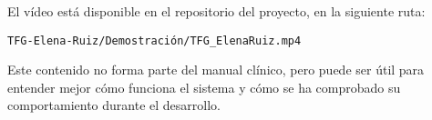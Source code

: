 El vídeo está disponible en el repositorio del proyecto, en la siguiente ruta:

\begin{center}
\texttt{TFG-Elena-Ruiz/Demostraci\'on/TFG\_ElenaRuiz.mp4}
\end{center}

Este contenido no forma parte del manual clínico, pero puede ser útil para entender mejor cómo funciona el sistema y cómo se ha comprobado su comportamiento durante el desarrollo.



    
     